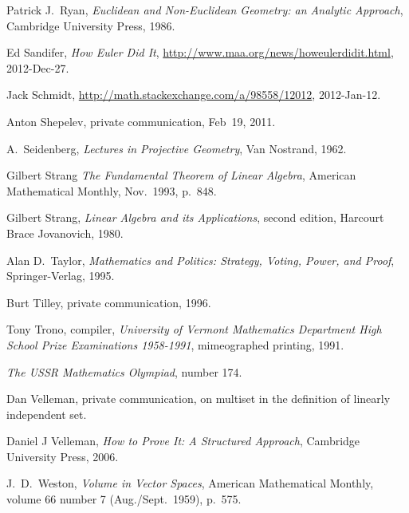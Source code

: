 \begin{thebibliography}{\makebox[2em][c]{{}\hfil{}}}
  Patrick J.~Ryan,
  \emph{Euclidean and Non-Euclidean Geometry: an Analytic Approach},
  Cambridge University Press, 1986.

  Ed Sandifer,
  \textit{How Euler Did It},
  \url{http://www.maa.org/news/howeulerdidit.html},
  2012-Dec-27.

  Jack Schmidt, %
  \url{http://math.stackexchange.com/a/98558/12012}, 
  2012-Jan-12.

  Anton Shepelev,
  private communication,
  Feb~19, 2011.

  A.~Seidenberg,
  \emph{Lectures in Projective Geometry},
  Van Nostrand, 1962.


  Gilbert Strang
  \emph{The Fundamental Theorem of Linear Algebra},
  American Mathematical Monthly,
  Nov.~1993, p.~848.

  Gilbert Strang,
  \emph{Linear Algebra and its Applications},
  second edition,
  Harcourt Brace Jovanovich,
  1980.

  Alan D.~Taylor,
  \emph{Mathematics and Politics: Strategy, Voting, Power, and Proof},
  Springer-Verlag,
  1995.

  Burt Tilley,
  private communication,
  1996.

  Tony Trono, compiler,
  \emph{University of Vermont Mathematics Department High School Prize
    Examinations 1958-1991},
  mimeographed printing, 1991.

  \emph{The USSR Mathematics Olympiad},
   number 174.

  Dan Velleman,
  private communication, on multiset in the definition of
  linearly independent set.

  Daniel J Velleman,
  \textit{How to Prove It: A Structured Approach},
  Cambridge University Press,
  2006.

  J.~D.\ Weston,
  \emph{Volume in Vector Spaces},
  American Mathematical Monthly,
  volume 66 number 7 (Aug./Sept.\ 1959),
  p.~575.


\end{thebibliography}
